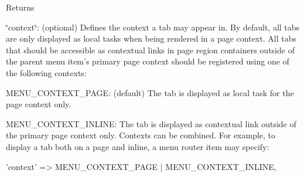 \begin{DoxyReturn}{Returns}
\begin{DoxyItemize}
\item \char`\"{}context\char`\"{}: (optional) Defines the context a tab may appear in. By default, all tabs are only displayed as local tasks when being rendered in a page context. All tabs that should be accessible as contextual links in page region containers outside of the parent menu item's primary page context should be registered using one of the following contexts:
\begin{DoxyItemize}
\item MENU\_\-CONTEXT\_\-PAGE: (default) The tab is displayed as local task for the page context only.
\item MENU\_\-CONTEXT\_\-INLINE: The tab is displayed as contextual link outside of the primary page context only. Contexts can be combined. For example, to display a tab both on a page and inline, a menu router item may specify: 
\begin{DoxyCode}
       'context' => MENU_CONTEXT_PAGE | MENU_CONTEXT_INLINE,
\end{DoxyCode}


\end{DoxyItemize}
\end{DoxyItemize}
\end{DoxyReturn}
